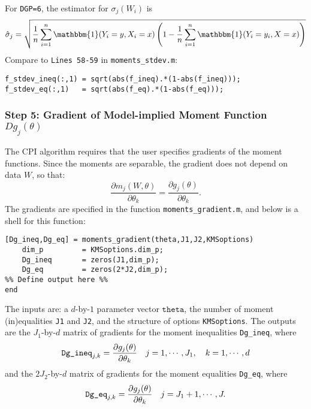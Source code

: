 \documentclass[12pt]{article}
\def\code#1{\texttt{#1}}
\begin{document}
For  \code{DGP=6}, the estimator for $\sigma_j(W_i)$ is
\begin{align*}
\hat \sigma_{j} = \sqrt{ \frac{1}{n}\sum_{i=1}^n \mathbbm{1}(Y_i = y, X_i=x) \left(1 - \frac{1}{n}\sum_{i=1}^n \mathbbm{1}(Y_i = y_i, X=x)  \right)}
\end{align*}
Compare to \code{Lines 58-59} in \code{moments\_stdev.m}:
\footnotesize
    \begin{lstlisting}[backgroundcolor = \color{gray!30},
                   xleftmargin = 0cm,
                   framexleftmargin = 1em]
f_stdev_ineq(:,1) = sqrt(abs(f_ineq).*(1-abs(f_ineq)));
f_stdev_eq(:,1)   = sqrt(abs(f_eq).*(1-abs(f_eq)));
    \end{lstlisting}\normalsize

\subsubsection*{Step 5: Gradient of Model-implied Moment Function $Dg_j(\theta)$}
The CPI algorithm requires that the user specifies gradients of the moment functions.  Since the moments are separable, the gradient does not depend on data $W$, so that:
\[
\frac{\partial m_j(W,\theta)}{\partial \theta_k} = \frac{\partial g_j(\theta)}{\partial \theta_k}.
\]
The gradients are specified in  the function \code{moments\_gradient.m}, and below is a shell for this function:
\footnotesize
\begin{lstlisting}[backgroundcolor = \color{gray!30},
                   xleftmargin = 0cm,
                   framexleftmargin = 1em]
[Dg_ineq,Dg_eq] = moments_gradient(theta,J1,J2,KMSoptions)
    dim_p         = KMSoptions.dim_p;
    Dg_ineq       = zeros(J1,dim_p);
    Dg_eq         = zeros(2*J2,dim_p);
%% Define output here %%
end
\end{lstlisting} \normalsize
The inputs are: a $d$-by-$1$ parameter vector $\code{theta}$, the number of moment (in)equalities \code{J1} and \code{J2}, and the structure of options \code{KMSoptions}.  The outputs are the $J_1$-by-$d$ matrix of gradients for the moment inequalities \code{Dg\_ineq}, where
\begin{align*}
\text{\code{Dg\_ineq}}_{j,k} = \frac{\partial g_j(\theta)}{\partial \theta_k} \quad j =1,\cdots,J_1,\quad  k =1,\cdots,d
\end{align*}
and the $2 J_2$-by-$d$ matrix of gradients for the moment equalities \code{Dg\_eq}, where
\begin{align*}
\text{\code{Dg\_eq}}_{j,k} = \frac{\partial g_j(\theta)}{\partial \theta_k} \quad j =J_1+1,\cdots,J.
\end{align*}
\end{document}
